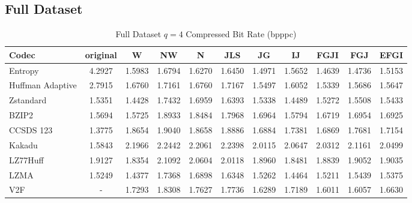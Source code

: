 \documentclass{article}
\begin{document}
\subsection{Full Dataset}
\begin{table}[h!]
\centering
\caption{Full Dataset $q=4$ Compressed Bit Rate (bpppc)}
\begin{tabular}{|l|cccccccccc|}
\hline
Codec &  original &      W &     NW &      N &    JLS &     JG &     IJ &   FGJI &    FGJ &   EFGI \\
\hline
Entropy & 4.2927 & 1.5983 & 1.6794 & 1.6270 & 1.6450 & 1.4971 & 1.5652 & 1.4639 & 1.4736 & 1.5153 \\
\hline
Huffman Adaptive &    2.7915 & 1.6760 & 1.7161 & 1.6760 & 1.7167 & 1.5497 & 1.6052 & 1.5339 & 1.5686 & 1.5647 \\
Zstandard        &    1.5351 & 1.4428 & 1.7432 & 1.6959 & 1.6393 & 1.5338 & 1.4489 & 1.5272 & 1.5508 & 1.5433 \\
BZIP2            &    1.5694 & 1.5725 & 1.8933 & 1.8484 & 1.7968 & 1.6964 & 1.5794 & 1.6719 & 1.6954 & 1.6925 \\
CCSDS 123        &    1.3775 & 1.8654 & 1.9040 & 1.8658 & 1.8886 & 1.6884 & 1.7381 & 1.6869 & 1.7681 & 1.7154 \\
Kakadu           &    1.5843 & 2.1966 & 2.2442 & 2.2061 & 2.2398 & 2.0115 & 2.0647 & 2.0312 & 2.1161 & 2.0499 \\
LZ77Huff         &    1.9127 & 1.8354 & 2.1092 & 2.0604 & 2.0118 & 1.8960 & 1.8481 & 1.8839 & 1.9052 & 1.9035 \\
LZMA             &    1.5249 & 1.4377 & 1.7368 & 1.6898 & 1.6348 & 1.5262 & 1.4464 & 1.5211 & 1.5439 & 1.5375 \\
V2F              &   - & 1.7293 & 1.8308 & 1.7627 & 1.7736 & 1.6289 & 1.7189 & 1.6011 & 1.6057 & 1.6630 \\
\hline
\end{tabular}
\end{table}
\end{document}
